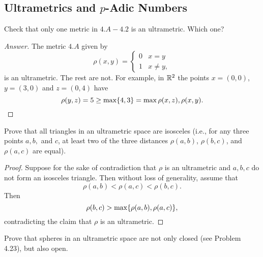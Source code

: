 \subsection{Ultrametrics and $p$-Adic Numbers}

\begin{majorEx}
    Check that only one metric in $4.A-4.2$ is an ultrametric. Which one?
\end{majorEx}

\begin{proof}[Answer]
    The metric $4.A$ given by
    \[
        \rho(x,y) = 
        \begin{cases}
            0 & x = y \\
            1 & x \ne y,
        \end{cases}
    \]
    is an ultrametric. The rest are not. For example, in $\mathbb{R}^2$ the points $x =
    (0,0)$, $y = (3,0)$ and $z = (0, 4)$ have
    \[
        \rho(y,z) = 5 \geq \max\{4, 3\} = \max{\rho(x,z), \rho(x,y)}.
    \]
\end{proof}

\begin{majorEx}
    Prove that all triangles in an ultrametric space are isosceles (i.e., for
    any three points $a,b,$ and $c$, at least two of the three distances
    $\rho(a,b)$, $\rho(b,c)$, and $\rho(a, c)$ are equal).
\end{majorEx}

\begin{proof}
    Suppose for the sake of contradiction that $\rho$ is an ultrametric and $a,
    b, c$ do not form an isosceles triangle. Then without loss of generality,
    assume that
    \[
        \rho(a,b) < \rho(a,c) < \rho(b,c).
    \]
    Then
    \[
        \rho(b,c) > \max\{\rho(a,b), \rho(a,c)\},
    \]
    contradicting the claim that $\rho$ is an ultrametric.
\end{proof}

\begin{majorEx}
    Prove that spheres in an ultrametric space are not only closed (see Problem
    4.23), but also open.
\end{majorEx}

